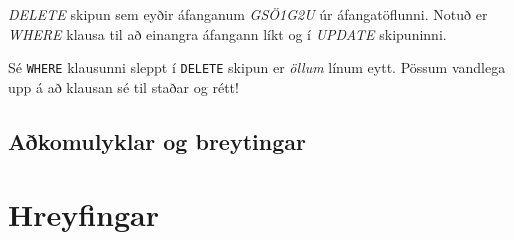 \begin{example}
\caption[DELETE]{\emph{DELETE} skipun sem eyðir áfanganum \emph{GSÖ1G2U} úr áfangatöflunni. Notuð er \emph{WHERE} klausa til að einangra áfangann líkt og í \emph{UPDATE} skipuninni.}
\label{sql:k7d4-delete}
\centering
{}
\end{example}

Sé \verb|WHERE| klausunni sleppt í \verb|DELETE| skipun er \emph{öllum} línum eytt. Pössum vandlega upp á að klausan sé til staðar og rétt!
\subsection{Aðkomulyklar og breytingar}

\section{Hreyfingar} %